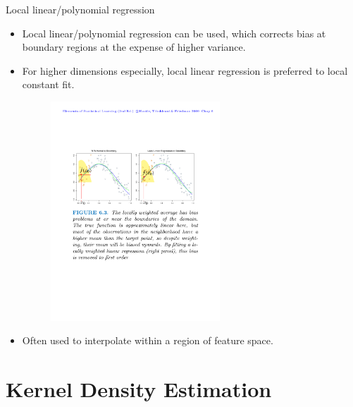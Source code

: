 \documentclass[aspectratio=169]{beamer}
\begin{document}
\begin{frame}{Local linear/polynomial regression}
    \begin{itemize}
        \item Local linear/polynomial regression can be used, which corrects bias at boundary regions at the expense of higher variance. 
        \item For higher dimensions especially, local linear regression is preferred to local constant fit.
        \begin{figure}
            \centering
            \includegraphics[width=0.6\textwidth]{figures/localkernelregression.pdf}
        \end{figure}
        \item Often used to interpolate within a region of feature space.
    \end{itemize}
\end{frame}


\section{Kernel Density Estimation}
\end{document}
